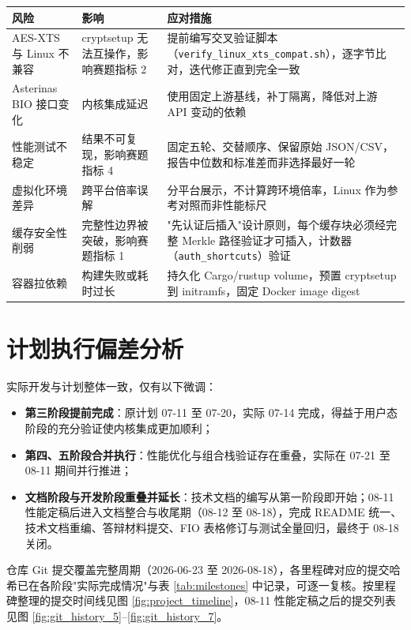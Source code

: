 \begin{table}[H]
    \centering
    \begin{tabular}{p{}p{}p{}}
        \toprule
        \textbf{风险} & \textbf{影响} & \textbf{应对措施} \\
        \midrule
        AES-XTS 与 Linux 不兼容 & cryptsetup 无法互操作，影响赛题指标 2 & 提前编写交叉验证脚本（\texttt{verify\_linux\_xts\_compat.sh}），逐字节比对，迭代修正直到完全一致 \\
        Asterinas BIO 接口变化 & 内核集成延迟 & 使用固定上游基线，补丁隔离，降低对上游 API 变动的依赖 \\
        性能测试不稳定 & 结果不可复现，影响赛题指标 4 & 固定五轮、交替顺序、保留原始 JSON/CSV，报告中位数和标准差而非选择最好一轮 \\
        虚拟化环境差异 & 跨平台倍率误解 & 分平台展示，不计算跨环境倍率，Linux 作为参考对照而非性能标尺 \\
        缓存安全性削弱 & 完整性边界被突破，影响赛题指标 1 & "先认证后插入"设计原则，每个缓存块必须经完整 Merkle 路径验证才可插入，计数器（\texttt{auth\_shortcuts}）验证 \\
        容器拉依赖 & 构建失败或耗时过长 & 持久化 Cargo/rustup volume，预置 cryptsetup 到 initramfs，固定 Docker image digest \\
        \bottomrule
    \end{tabular}
\end{table}

\section{计划执行偏差分析}

实际开发与计划整体一致，仅有以下微调：

\begin{itemize}
    \item \textbf{第三阶段提前完成}：原计划 07-11 至 07-20，实际 07-14 完成，得益于用户态阶段的充分验证使内核集成更加顺利；
    \item \textbf{第四、五阶段合并执行}：性能优化与组合栈验证存在重叠，实际在 07-21 至 08-11 期间并行推进；
    \item \textbf{文档阶段与开发阶段重叠并延长}：技术文档的编写从第一阶段即开始；08-11 性能定稿后进入文档整合与收尾期（08-12 至 08-18），完成 README 统一、技术文档重编、答辩材料提交、FIO 表格修订与测试全量回归，最终于 08-18 关闭。
\end{itemize}

仓库 Git 提交覆盖完整周期（2026-06-23 至 2026-08-18），各里程碑对应的提交哈希已在各阶段"实际完成情况"与表 \ref{tab:milestones} 中记录，可逐一复核。按里程碑整理的提交时间线见图 \ref{fig:project_timeline}，08-11 性能定稿之后的提交列表见图 \ref{fig:git_history_5}--\ref{fig:git_history_7}。

